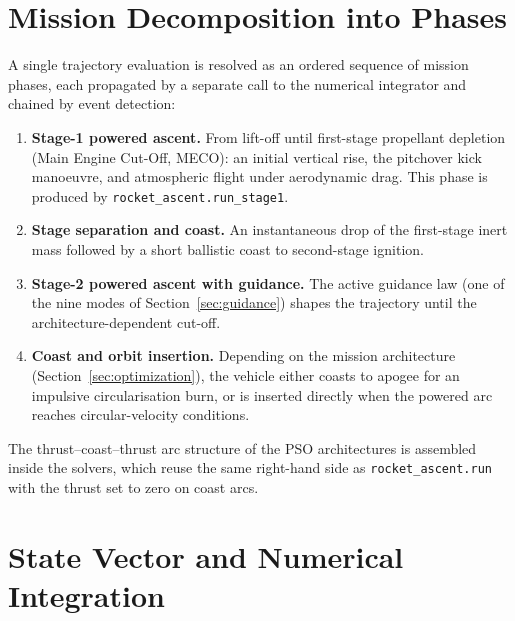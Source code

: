\section{Mission Decomposition into Phases}
\label{sec:phases}

A single trajectory evaluation is resolved as an ordered sequence of mission
phases, each propagated by a separate call to the numerical integrator and
chained by event detection:

\begin{enumerate}
  \item \textbf{Stage-1 powered ascent.} From lift-off until first-stage
        propellant depletion (Main Engine Cut-Off, MECO): an initial vertical
        rise, the pitchover kick manoeuvre, and atmospheric flight under
        aerodynamic drag. This phase is produced by
        \texttt{rocket\_ascent.run\_stage1}.

  \item \textbf{Stage separation and coast.} An instantaneous drop of the
        first-stage inert mass followed by a short ballistic coast to
        second-stage ignition.

  \item \textbf{Stage-2 powered ascent with guidance.} The active guidance law
        (one of the nine modes of Section~\ref{sec:guidance}) shapes the
        trajectory until the architecture-dependent cut-off.

  \item \textbf{Coast and orbit insertion.} Depending on the mission
        architecture (Section~\ref{sec:optimization}), the vehicle either coasts
        to apogee for an impulsive circularisation burn, or is inserted directly
        when the powered arc reaches circular-velocity conditions.
\end{enumerate}

The thrust--coast--thrust arc structure of the PSO architectures is assembled
inside the solvers, which reuse the same right-hand side as
\texttt{rocket\_ascent.run} with the thrust set to zero on coast arcs.

\section{State Vector and Numerical Integration}
\label{sec:state_integration}

